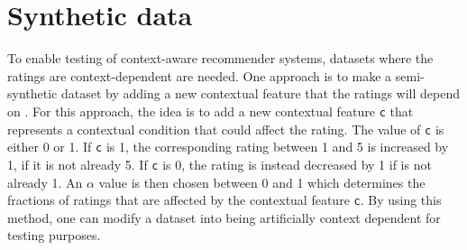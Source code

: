 \section{Synthetic data}
To enable testing of context-aware recommender systems, datasets where the ratings are context-dependent are needed.
One approach is to make a semi-synthetic dataset by adding a new contextual feature that the ratings will depend on \cite{baltrunasContextItemSplit}.
For this approach, the idea is to add a new contextual feature \texttt{c} that represents a contextual condition that could affect the rating.
The value of \texttt{c} is either 0 or 1. 
If \texttt{c} is 1, the corresponding rating between 1 and 5 is increased by 1, if it is not already 5.
If \texttt{c} is 0, the rating is instead decreased by 1 if is not already 1.
An $\alpha$ value is then chosen between 0 and 1 which determines the fractions of ratings that are affected by the contextual feature \texttt{c}.
By using this method, one can modify a dataset into being artificially context dependent for testing purposes.
